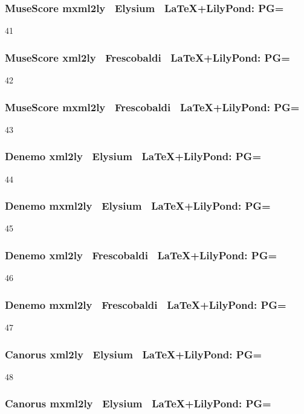 \subsubsection{MuseScore \ra mxml2ly \ra\ Elysium \ra\ \LaTeX+LilyPond: PG=}

41

\subsubsection{MuseScore \ra xml2ly \ra\ Frescobaldi \ra\ \LaTeX+LilyPond: PG=} 

42

\subsubsection{MuseScore \ra mxml2ly \ra\ Frescobaldi \ra\ \LaTeX+LilyPond: PG=} 

43

\subsubsection{Denemo \ra xml2ly \ra\ Elysium \ra\ \LaTeX+LilyPond: PG=} 

44

\subsubsection{Denemo \ra mxml2ly \ra\ Elysium \ra\ \LaTeX+LilyPond: PG=} 

45

\subsubsection{Denemo \ra xml2ly \ra\ Frescobaldi \ra\ \LaTeX+LilyPond: PG=}

46

\subsubsection{Denemo \ra mxml2ly \ra\ Frescobaldi \ra\ \LaTeX+LilyPond: PG=}

47

\subsubsection{Canorus \ra xml2ly \ra\ Elysium \ra\ \LaTeX+LilyPond: PG=}

48

\subsubsection{Canorus \ra mxml2ly \ra\ Elysium \ra\ \LaTeX+LilyPond: PG=}

